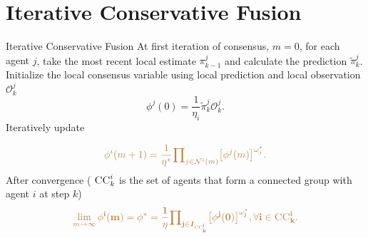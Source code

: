 \documentclass{beamer}
\newcommand{\vect}{\bf}
\newcommand{\bIs}[1]{\boldsymbol{I}_{#1}}  %
\theoremstyle{remark}
\newcommand{\suf}[1]{\textsc{\tiny #1}}  %
\begin{document}
\section{Iterative Conservative Fusion}
\begin{frame}{Iterative Conservative Fusion}
At first iteration of consensus, {\color{blue}$m=0$}, for {\color{blue}each agent $j$}, take the most recent local estimate {\color{blue}${\pi}_{k-1}^j$} and calculate the prediction {\color{blue}$\tilde{\pi}_k^j$}. 
Initialize the local 
consensus variable using local prediction and local observation {\color{blue}$\mathcal{O}_k^j$}
{\color{brown} $$\mathcal{\phi}^j(0) 
=\frac{1}{\eta_i}\tilde{\pi}_k^j\mathcal{O}_k^j. $$ }
Iteratively update 

\begin{equation*}
{\color{brown}\mathcal{\phi}^i(m + 1) = 	\frac{1}{\eta^*} {\prod\nolimits_{j \in {\cal N}^{i}(m)} }  \big[\mathcal{\phi}^j(m)\big]^{\omega_{j}^*}.}
\end{equation*}
After convergence ( {\color{blue}
$\textsc{CC}^i_k$} is the set of agents that form a 
{\color{blue}connected 
group} with agent $i$ at step $k$)
\begin{equation*}
{\color{brown}
\lim\limits_{m\rightarrow 
	\infty}\vect{\phi}^{i}(m) = \mathcal{\phi}^*=	
\frac{1}{\eta} 
{\prod\nolimits_{j \in \bIs{\suf{CC}^i_k} } }  
\big[\mathcal{\phi}^j(0)\big]^{\omega_{j}^*},\forall i \in \textsc{CC}^i_k.}
\end{equation*}

\end{frame}
\end{document}

